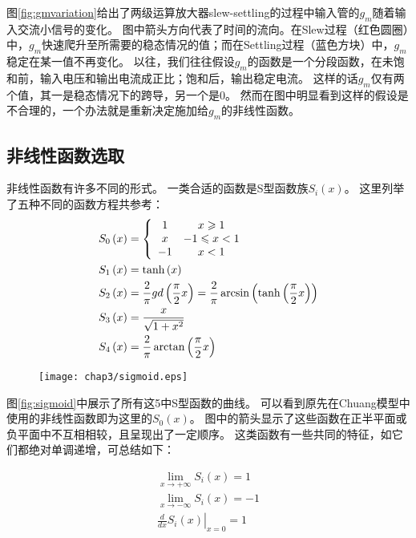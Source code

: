 图\ref{fig:gmvariation}给出了两级运算放大器slew-settling的过程中输入管的$g_m$随着输入交流小信号的变化。
图中箭头方向代表了时间的流向。在Slew过程（红色圆圈）中，$g_m$快速爬升至所需要的稳态情况的值；而在Settling过程（蓝色方块）中，$g_m$稳定在某一值不再变化。
以往，我们往往假设$g_m$的函数是一个分段函数，在未饱和前，输入电压和输出电流成正比；饱和后，输出稳定电流。
这样的话$g_m$仅有两个值，其一是稳态情况下的跨导，另一个是$0$。
然而在图中明显看到这样的假设是不合理的，一个办法就是重新决定施加给$g_m$的非线性函数。

\subsection{非线性函数选取}
\label{subsec:time:simp:nonlinear}

非线性函数有许多不同的形式。
一类合适的函数是S型函数族$S_i\left(x\right)$。
这里列举了五种不同的函数方程共参考：
\begin{align}
&{S_0}\left( x \right) = \left\{ {\begin{array}{*{20}{c}}1 & {x \geqslant 1}  \\x & { - 1 \leqslant x < 1}  \\{ - 1} & {x < 1}  \\\end{array} } \right. \\
&{S_1}\left( x \right) = \tanh \left( x \right) \hfill \\
&{S_2}\left( x \right) = \frac{2}{\pi }gd\left( {\frac{\pi }	{2}x} \right) = \frac{2}{\pi }\arcsin \left( {\tanh \left( {\frac{\pi }{2}x} \right)} \right)\\
&{S_3}\left( x \right) = \frac{x}{{\sqrt {1 + {x^2}} }}\\
&{S_4}\left( x \right) = \frac{2}{\pi }\arctan \left( {\frac{\pi }{2}x} \right)
\end{align}

\begin{figure}[!htp]
	\centering
	\texttt{[image: chap3/sigmoid.eps]}
\end{figure}

图\ref{fig:sigmoid}中展示了所有这5中S型函数的曲线。
可以看到原先在Chuang模型中使用的非线性函数即为这里的$S_0\left(x\right)$。
图中的箭头显示了这些函数在正半平面或负平面中不互相相较，且呈现出了一定顺序。
这类函数有一些共同的特征，如它们都绝对单调递增，可总结如下：

\begin{eqnarray}
\mathop {\lim }\limits_{x \to  + \infty } {S_i}\left( x \right) = 1\\
\mathop {\lim }\limits_{x \to  - \infty } {S_i}\left( x \right) = -1\\
{\left. {\frac{d}{{dx}}{S_i}\left( x \right)} \right|_{x = 0}} = 1
\end{eqnarray}

